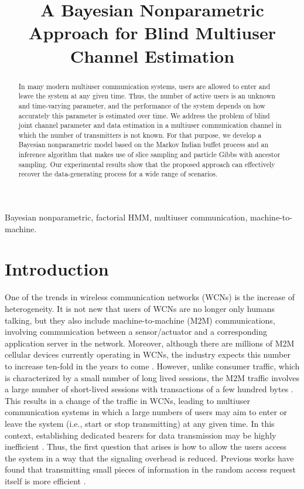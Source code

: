 \documentclass[a4paper]{article}
\title{A Bayesian Nonparametric Approach for Blind Multiuser Channel Estimation}
\begin{document}
%
\maketitle
%
\begin{abstract}
In many modern multiuser communication systems, users are allowed to enter and leave the system at any given time. Thus, the number of active users is an unknown and time-varying parameter, and the performance of the system depends on how accurately this parameter is estimated over time. We address the problem of blind joint channel parameter and data estimation in a multiuser communication channel in which the number of transmitters is not known. For that purpose, we develop a Bayesian nonparametric model based on the Markov Indian buffet process and an inference algorithm that makes use of slice sampling and particle Gibbs with ancestor sampling. Our experimental results show that the proposed approach can effectively recover the data-generating process for a wide range of scenarios.
\end{abstract}
%
\begin{keywords}
Bayesian nonparametric, factorial HMM, multiuser communication, machine-to-machine.
\end{keywords}
%
\section{Introduction}
\label{sec:intro}
One of the trends in wireless communication networks (WCNs) is the increase of heterogeneity. It is not new that users of WCNs are no longer only humans talking, but they also include machine-to-machine (M2M) communications, involving communication between a sensor/actuator and a corresponding application server in the network. Moreover, although there are millions of M2M cellular devices currently operating in WCNs, the industry expects this number to increase ten-fold in the years to come \cite{Dhillon2013}.
%
However, unlike consumer traffic, which is characterized by a small number of long lived sessions, the M2M traffic involves a large number of short-lived sessions with transactions of a few hundred bytes  \cite{Dhillon2013}.  
%
This results in a change of the traffic in WCNs,  leading to multiuser communication systems in which a large numbers of users may aim to enter or leave the system (i.e., start or stop transmitting) at any given time. 
%
In this context, establishing dedicated bearers for data transmission may be highly inefficient \cite{Dhillon2013}. Thus, the first question that arises is how to allow the users access the system in a way that the signaling overhead is reduced. Previous works have found that transmitting small pieces of information in the random access request itself is more efficient \cite{Chen2010}. 
\end{document}
